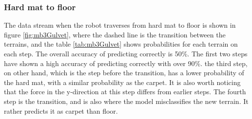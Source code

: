 \documentclass[USenglish]{ifimaster}  %
\begin{document}
	
	\begin{table}[h]
		\centering
		\caption{The table showing probability of each terrain per step from floor to carpet. Marked green represent correct prediction and correct terrain, red represent wrong prediction and yellow is the correct prediction if it got wrong.}
		\label{tab:Gulvet4teppe}
	\end{table}
	\FloatBarrier
	\clearpage
	
\subsubsection{Hard mat to floor} \label{subsec:hmf}
The data stream when the robot traverses from hard mat to floor is shown in figure \ref{fig:mb3Gulvet}, where the dashed line is the transition between the terrains, and the table \ref{tab:mb3Gulvet} shows probabilities for each terrain on each step. The overall accuracy of predicting correctly is 50\%. The first two steps have shown a high accuracy of predicting correctly with over 90\%. the third step, on other hand, which is the step before the transition, has a lower probability of the hard mat, with a similar probability as the carpet. It is also worth noticing that the force in the y-direction at this step differs from earlier steps. The fourth step is the transition, and is also where the model misclassifies the new terrain. It rather predicts it as carpet than floor.
		
\end{document}
